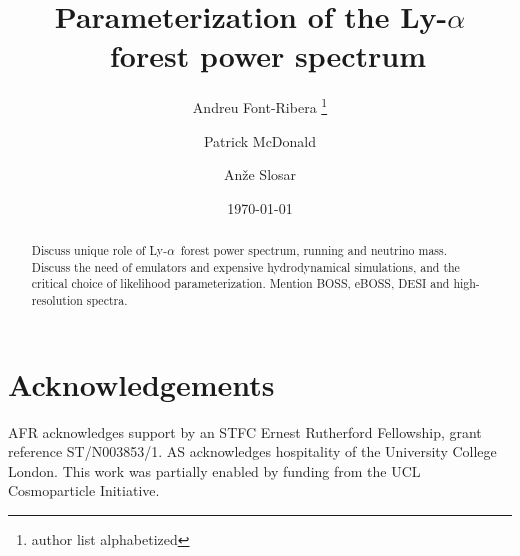 \documentclass[preprintnumbers,prd,superscriptaddress,notitlepage,nofootinbib] {revtex4-1}
\newcommand{\lya}{Ly-$\alpha$}
\begin{document}
\title{Parameterization of the \lya\ forest power spectrum}

\author{Andreu Font-Ribera \footnote{author list alphabetized}}
\author{Patrick McDonald}
\author{An\v{z}e Slosar}

\date{\today}

\begin{abstract}
Discuss unique role of \lya\ forest power spectrum, running and neutrino mass.
Discuss the need of emulators and expensive hydrodynamical simulations, and
the critical choice of likelihood parameterization.
Mention BOSS, eBOSS, DESI and high-resolution spectra.
\end{abstract}

\maketitle















\section*{Acknowledgements}
AFR acknowledges support by an STFC Ernest Rutherford Fellowship, grant reference ST/N003853/1.
AS acknowledges hospitality of the University College London.
This work was partially enabled by funding from the UCL Cosmoparticle
Initiative.




\end{document}
